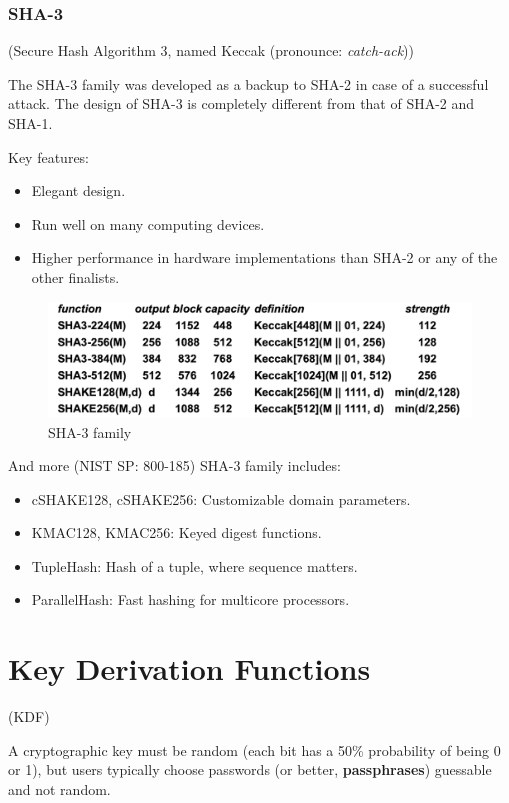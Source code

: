 \subsubsection*{SHA-3}
\begin{center}
    (Secure Hash Algorithm 3, named Keccak (pronounce: \textit{catch-ack}))
\end{center}
The SHA-3 family was developed as a backup to SHA-2 in case of a successful attack. The design of SHA-3 is completely different from that of SHA-2 and SHA-1.

\vspace{0.5cm}

\noindent Key features:
\begin{itemize}
    \item Elegant design.
    \item Run well on many computing devices.
    \item Higher performance in hardware implementations than SHA-2 or any of the other finalists.
\end{itemize}

\begin{figure}[H]
    \centering
    \includegraphics[width=\linewidth]{Images/Cryptography/sha_3.png}
    \caption{SHA-3 family}
\end{figure}

\vspace{0.5cm}

And more (NIST SP: 800-185) SHA-3 family includes:
\begin{itemize}
    \item cSHAKE128, cSHAKE256: Customizable domain parameters.
    \item KMAC128, KMAC256: Keyed digest functions.
    \item TupleHash: Hash of a tuple, where sequence matters.
    \item ParallelHash: Fast hashing for multicore processors.
\end{itemize}

\section{Key Derivation Functions}
\begin{center}
    (KDF)
\end{center}
A cryptographic key must be random (each bit has a 50\% probability of being 0 or 1), but users typically choose passwords (or better, \textbf{passphrases}) guessable and not random. 

